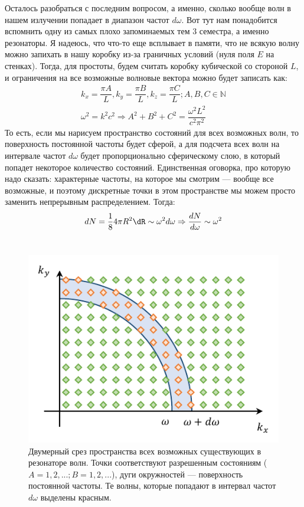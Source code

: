 \documentclass[12pt]{article}
\begin{document}
\vspace{1mm}\noindent
Осталось разобраться с последним вопросом, а именно, сколько вообще волн в нашем излучении попадает в диапазон частот $d\omega$. Вот тут нам понадобится вспомнить одну из самых плохо запоминаемых тем 3 семестра, а именно резонаторы. Я надеюсь, что что-то еще всплывает в памяти, что не всякую волну можно запихать в нашу коробку из-за граничных условий (нуля поля $E$ на стенках). Тогда, для простоты, будем считать коробку кубической со стороной $L$, и ограничения на все возможные волновые вектора можно будет записать как:
\begin{gather*}
    k_x = \dfrac{\pi A}{L}, k_y = \dfrac{\pi B}{L}, k_z = \dfrac{\pi C}{L}; A, B, C\in \mathbb{N}\\
    \omega^2 = k^2c^2 \Rightarrow A^2+B^2+C^2 = \dfrac{\omega^2L^2}{c^2\pi^2}
\end{gather*}
То есть, если мы нарисуем пространство состояний для всех возможных волн, то поверхность постоянной частоты будет сферой, а для подсчета всех волн на интервале частот $d\omega$ будет пропорционально сферическому слою, в который попадет некоторое количество состояний. Единственная оговорка, про которую надо сказать: характерные частоты, на которое мы смотрим --- вообще все возможные, и поэтому дискретные точки в этом пространстве мы можем просто заменить непрерывным распределением. Тогда:
\begin{equation}
    dN = \dfrac{1}{8}4\pi R^2 \dR \sim \omega^2d\omega \Rightarrow \dfrac{dN}{d\omega} \sim \omega^2
\end{equation}
\\
\begin{figure}[h]
    \centering
    \includegraphics[scale=1.5]{Seminar_01/pics/pic_03.pdf}
    \caption{Двумерный срез пространства всех возможных существующих в резонаторе волн. Точки соответствуют разрешенным состояниям ($A=1, 2, ...; B = 1, 2, ...$), дуги окружностей --- поверхность постоянной частоты. Те волны, которые попадают в интервал частот $d\omega$ выделены красным.}
    \label{fig:sem_01_dN_domega}
\end{figure}
\end{document}

